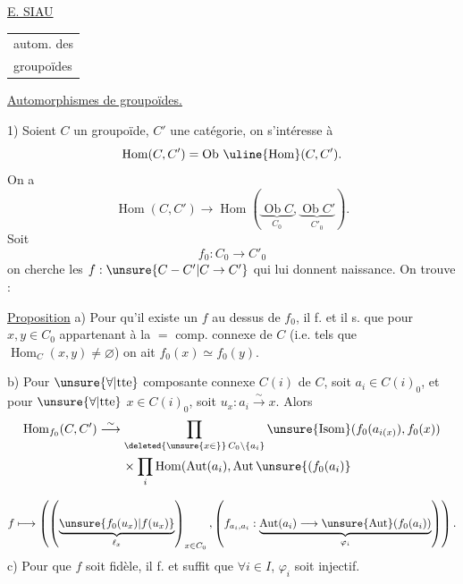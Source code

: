 
\uline{E. SIAU}

\begin{tabular}{l}
autom. des\\
groupoïdes
\end{tabular}

\uline{Automorphismes de groupoïdes.}

1) Soient $C$  un groupoïde,
$C'$ une catégorie, on s'intéresse à
\[
\operatorname{Hom}(C,C')=\operatorname{Ob}\,\uline{\operatorname{Hom}}(C,C').
\]
On a
\[
\operatorname{Hom}(C,C')\longrightarrow
\operatorname{Hom}(\underbrace{\operatorname{Ob}C}_{C_0},\underbrace{\operatorname{Ob}C'}_{C'_0}).
\]
Soit
\[ f_0:C_0\longrightarrow C'_0 \]
on cherche les $f:\unsure{C-C'|C\to C'}$ qui lui donnent naissance. On trouve :

\uline{Proposition} a) Pour qu'il existe un $f$ au dessus de $f_0$, il f. et il s.
que pour $x,y\in C_0$ appartenant à la $=$ comp. connexe de $C$
(i.e. tels que $\operatorname{Hom}_C(x,y)\ne\varnothing$) on ait
$f_0(x)\simeq f_0(y)$.

b) Pour $\unsure{\forall|\text{tte}}$ composante connexe $C(i)$ de $C$, soit $a_i\in C(i)_0$,
et pour $\unsure{\forall|\text{tte}}$ $x\in C(i)_0$, soit
$u_x:a_i\overset{\sim}{\longrightarrow}x$. Alors
\[
\begin{aligned}
\operatorname{Hom}_{f_0}(C,C')&\overset{\sim}{\longrightarrow}
\prod_{\deleted{\unsure{x\in}}\,C_0\setminus\{a_i\}}
\unsure{\operatorname{Isom}}(f_0(a_{i(x)}),f_0(x))\\
&\qquad\times\prod_i\operatorname{Hom}(\operatorname{Aut}(a_i),\operatorname{Aut}\unsure{(f_0(a_i)}
\end{aligned}
\]

\[
f\longmapsto\left(
\left(\underbrace{\unsure{f_0(u_x)|f(u_x)}}_{\ell_x}\right)_{x\in C_0},
\left(f_{a_i,a_i}:\underbrace{\operatorname{Aut}(a_i)\longrightarrow
\unsure{\operatorname{Aut}}(f_0(a_i))}_{\varphi_i}\right)\right).
\]
c) Pour que $f$ soit fidèle, il f. et suffit que $\forall i\in I$, $\varphi_i$ soit injectif.

